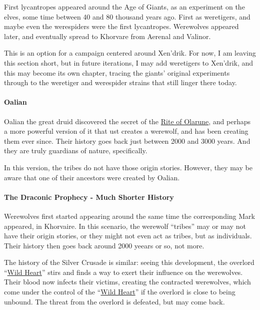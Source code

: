 \documentclass[twocolumn]{dndbook}
\begin{document}
First lycantropes appeared around the Age of Giants, as an experiment on the elves, some time between 40 and 80 thousand years ago.
First as weretigers, and maybe even the werespiders were the first lycantropes.
Werewolves appeared later, and eventually spread to Khorvare from Aerenal and Valinor.\par

This is an option for a campaign centered around Xen'drik.
For now, I am leaving this section short, but in future iterations,
I may add weretigers to Xen'drik, and this may become its own chapter,
tracing the giants' original experiments through to the weretiger
and werespider strains that still linger there today.\par

\paragraph*{Oalian}

Oalian the great druid discovered the secret of the \hyperref[spell:rite-of-olarune]{Rite of Olarune}, and perhaps a more powerful version of it that ust creates a werewolf, and has been creating them ever since.
Their history goes back just between 2000 and 3000 years. And they are truly guardians of nature, specifically.

In this version, the tribes do not have those origin stories. However, they may be aware that one of their ancestors were created by Oalian.\par

\paragraph*{The Draconic Prophecy - Much Shorter History}

Werewolves first started appearing around the same time the corresponding Mark appeared, in Khorvaire.
In this scenario, the werewolf ``tribes'' may or may not have their origin stories, or they might not even act as tribes, but as individuals.
Their history then goes back around 2000 yeears or so, not more.\par

The history of the Silver Crusade is similar: seeing this development, the overlord ``\href{https://keith-baker.com/2025-lycanthropes/}{Wild Heart}'' stirs and finds a way to exert their influence on the werewolves.
Their blood now infects their victims, creating the contracted werewolves, which come under the control of the ``\href{https://keith-baker.com/2025-lycanthropes/}{Wild Heart}'' if the overlord is close to being unbound.
The threat from the overlord is defeated, but may come back.\par
\end{document}
